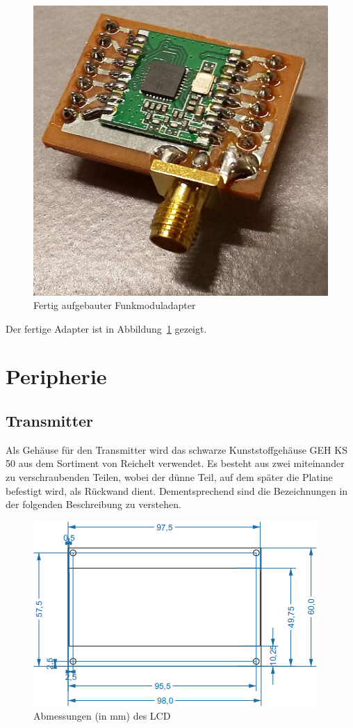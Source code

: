 \documentclass[paper=a4, parskip, numbers=noenddot, toc=listof, headsepline]{scrbook}
\begin{document}
				\begin{figure}
					\centering
					\includegraphics[width=.5\textwidth]{bilder/funkmoduladapter}
					\caption{Fertig aufgebauter Funkmoduladapter}
					\label{fig:funkmoduladapter}
				\end{figure}

				Der fertige Adapter ist in Abbildung~\ref{fig:funkmoduladapter} gezeigt.

			\section{Peripherie}

				\subsection{Transmitter}
					Als Gehäuse für den Transmitter wird das schwarze Kunststoffgehäuse GEH KS 50 aus dem Sortiment von Reichelt verwendet. Es besteht aus zwei miteinander zu verschraubenden Teilen, wobei der dünne Teil, auf dem später die Platine befestigt wird, als Rückwand dient. Dementsprechend sind die Bezeichnungen in der folgenden Beschreibung zu verstehen.

					\begin{figure}
						\centering
						\includegraphics[]{bilder/lcddimensions}
						\caption{Abmessungen (in mm) des LCD}
						\label{fig:lcddimensions}
					\end{figure}
\end{document}
